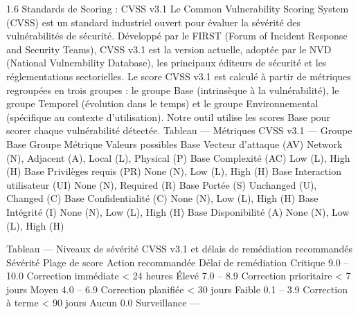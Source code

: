1.6  Standards de Scoring : CVSS v3.1
Le Common Vulnerability Scoring System (CVSS) est un standard industriel ouvert pour évaluer la sévérité des vulnérabilités de sécurité. Développé par le FIRST (Forum of Incident Response and Security Teams), CVSS v3.1 est la version actuelle, adoptée par le NVD (National Vulnerability Database), les principaux éditeurs de sécurité et les réglementations sectorielles.
Le score CVSS v3.1 est calculé à partir de métriques regroupées en trois groupes : le groupe Base (intrinsèque à la vulnérabilité), le groupe Temporel (évolution dans le temps) et le groupe Environnemental (spécifique au contexte d'utilisation). Notre outil utilise les scores Base pour scorer chaque vulnérabilité détectée.
Tableau — Métriques CVSS v3.1 — Groupe Base
Groupe	Métrique	Valeurs possibles
Base	Vecteur d'attaque (AV)	Network (N), Adjacent (A), Local (L), Physical (P)
Base	Complexité (AC)	Low (L), High (H)
Base	Privilèges requis (PR)	None (N), Low (L), High (H)
Base	Interaction utilisateur (UI)	None (N), Required (R)
Base	Portée (S)	Unchanged (U), Changed (C)
Base	Confidentialité (C)	None (N), Low (L), High (H)
Base	Intégrité (I)	None (N), Low (L), High (H)
Base	Disponibilité (A)	None (N), Low (L), High (H)

Tableau — Niveaux de sévérité CVSS v3.1 et délais de remédiation recommandés
Sévérité	Plage de score	Action recommandée	Délai de remédiation
Critique	9.0 – 10.0	Correction immédiate	< 24 heures
Élevé	7.0 – 8.9	Correction prioritaire	< 7 jours
Moyen	4.0 – 6.9	Correction planifiée	< 30 jours
Faible	0.1 – 3.9	Correction à terme	< 90 jours
Aucun	0.0	Surveillance	—

